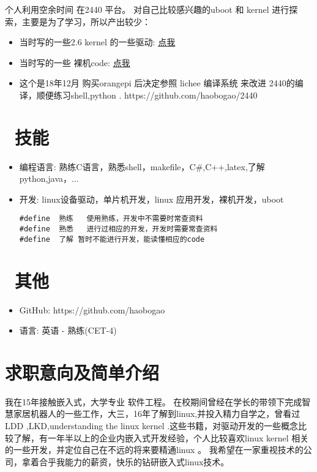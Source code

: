 \documentclass[a4paper,8pt,oneside]{resume}
\begin{document}
\begin{onehalfspacing}
个人利用空余时间 在2440 平台。 对自己比较感兴趣的uboot 和 kernel 进行探索，主要是为了学习，所以产出较少：
\begin{itemize}
\item 当时写的一些2.6 kernel 的一些驱动: \href{https://github.com/haobogao/2440_drv}{ 点我 } 

\item 当时写的一些 裸机code: \href{https://github.com/haobogao/2440_boot}{ 点我 } 

\item 这个是18年12月 购买orangepi 后决定参照 lichee 编译系统 来改进 2440的编译，顺便练习shell,python .  https://github.com/haobogao/2440
\end{itemize}
\end{onehalfspacing}


\section{\faCogs\  技能}
\begin{itemize}[parsep=0.5ex]
  \item 编程语言: 熟练C语言，熟悉shell，makefile，C\#,C++,latex,了解 python,java，...
  \item 开发: linux设备驱动，单片机开发，linux 应用开发，裸机开发，uboot
  \begin{lstlisting}
#define  熟练   使用熟练，开发中不需要时常查资料
#define  熟悉   进行过相应的开发，开发时需要常查资料
#define  了解	暂时不能进行开发，能读懂相应的code
\end{lstlisting}
\end{itemize}

\section{\faInfo\ 其他}
\begin{itemize}[parsep=0.5ex]
  \item GitHub: https://github.com/haobogao
  \item 语言: 英语 - 熟练(CET-4)
\end{itemize}

\section{求职意向及简单介绍}

我在15年接触嵌入式，大学专业 软件工程。 在校期间曾经在学长的带领下完成智慧家居机器人的一些工作，大三，16年了解到linux,并投入精力自学之，曾看过LDD
,LKD,understanding the linux kernel .这些书籍，对驱动开发的一些概念比较了解，有一年半以上的企业内嵌入式开发经验，个人比较喜欢linux kernel 相关的一些开发，并定位自己在不远的将来要精通linux 。
我希望在一家重视技术的公司，拿着合乎我能力的薪资，快乐的钻研嵌入式linux技术。   
\end{document}

